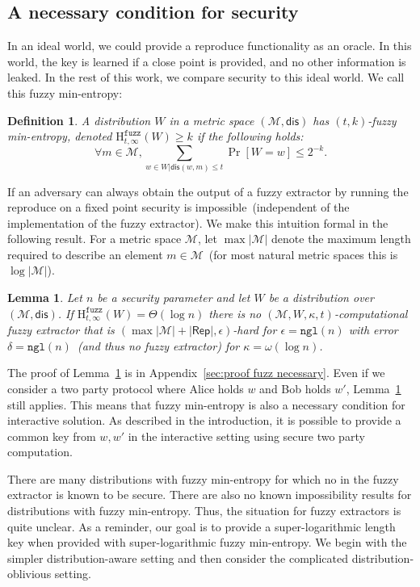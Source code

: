 \documentclass[11pt]{article}
\newcommand{\apref}[1]{\mbox{Appendix~\ref{#1}}}
\newcommand{\lemref}[1]{\mbox{Lemma~\ref{#1}}}
\newcommand{\class}[1]{{\ensuremath{\mathsf{#1}}}}
\newcommand{\rep}{\ensuremath{\class{Rep}}\xspace}
\newcommand{\dis}{\ensuremath{\mathsf{dis}}}
\newcommand{\ngl}{\ensuremath{\mathtt{ngl}}\xspace}
\newcommand{\Hfuzz}{\mathrm{H}^{\mathtt{fuzz}}_{t,\infty}}
\newtheorem{lemma}[theorem]{Lemma}
\newtheorem{definition}[theorem]{Definition}
\begin{document}
\subsection{A necessary condition for security}
\label{sec:minimal conditions}

In an ideal world, we could provide a reproduce functionality as an oracle.  In this world, the key is learned if a close point is provided, and no other information is leaked.  In the rest of this work, we compare security to this ideal world.  We call this fuzzy min-entropy:

\begin{definition}
\label{def:fuzzy min-ent}
A distribution $W$ in a metric space $(\mathcal{M}, \dis)$ has $(t, k)$-fuzzy min-entropy, denoted $\Hfuzz(W) \ge k$ if the following holds:
\[
\forall m\in \mathcal{M},  \sum_{w\in W | \dis(w, m)\le t} \Pr[W=w] \leq 2^{-k}.
\]
\end{definition}

If an adversary can always obtain the output of a fuzzy extractor by running the reproduce on a fixed point security is impossible~(independent of the implementation of the fuzzy extractor).  We make this intuition formal in the following result.  
For a metric space $\mathcal{M}$, let $\max |\mathcal{M}|$ denote the maximum length required to describe an element $m\in\mathcal{M}$~(for most natural metric spaces this is $\log |\mathcal{M}|$).
\begin{lemma}
\label{lem:fuzz necessary}
Let $n$ be a security parameter and let $W$ be a distribution over $(\mathcal{M}, \dis)$.
If $\Hfuzz (W) = \Theta(\log n)$ there is no $(\mathcal{M}, W, \kappa, t)$-computational fuzzy extractor that is $(\max |\mathcal{M}| +  |\rep|, \epsilon)$-hard for $\epsilon = \ngl(n)$ with error $\delta = \ngl(n)$~(and thus no fuzzy extractor) for $\kappa =\omega(\log n)$.
\end{lemma}

The proof of \lemref{lem:fuzz necessary} is in \apref{sec:proof fuzz necessary}.
Even if we consider a two party protocol where Alice holds $w$ and Bob holds $w'$, 
\lemref{lem:fuzz necessary} still applies.  
This means that fuzzy min-entropy is also a necessary condition for interactive solution.  As described in the introduction, it is possible to provide a common key from $w, w'$ in the interactive setting using secure two party computation.

There are many distributions with fuzzy min-entropy for which no in the fuzzy extractor is known to be secure.  There are also no known impossibility results for distributions with fuzzy min-entropy.  Thus, the situation for fuzzy extractors is quite unclear.
As a reminder, our goal is to provide a super-logarithmic length key when provided with super-logarithmic fuzzy min-entropy.  We begin with the simpler distribution-aware setting and then consider the complicated distribution-oblivious setting.
\end{document}

